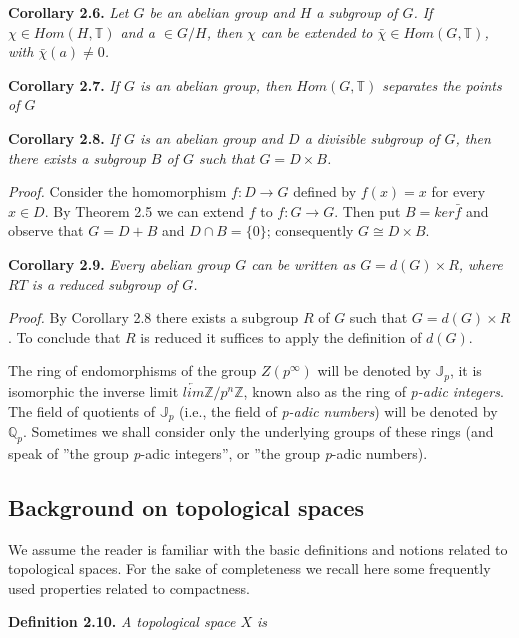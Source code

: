 \documentclass[12pt]{article}
\begin{document}
\textbf{Corollary 2.6.} \emph{Let $ G $ be an abelian group and $ H $ a subgroup of $ G $. If $ \chi \in Hom (H,\mathbb{T}) $ and a $ \in G / H $, then $ \chi $
can be extended to $ \bar{\chi} \in Hom (G,\mathbb{T}) $, with $ \bar{\chi}(a) \neq 0 $.}


\textbf{Corollary 2.7.} \emph{If $ G $ is an abelian group, then $ Hom (G,\mathbb{T}) $ separates the points of $ G $}


\textbf{Corollary 2.8.} \emph{If $ G $ is an abelian group and $ D $ a divisible subgroup of $ G $, then there exists a subgroup $ B $ of $ G $
such that $ G = D \times B $.}


\emph{Proof.} Consider the homomorphism $ f : D \to G $ defined by $ f(x) = x $ for every $ x \in D $. By Theorem 2.5 we can
extend $ f $ to $ f : G \to G $. Then put $ B = ker \bar{f} $ and observe that $ G = D + B $ and $ D \cap B = \{0\} $; consequently
$ G \cong D \times B $.


\textbf{Corollary 2.9.} \emph{Every abelian group $ G $ can be written as $ G = d(G) \times R $, where $ RT $ is a reduced subgroup of $ G $.}


\emph{Proof.} By Corollary 2.8 there exists a subgroup $ R $ of $ G $ such that $ G = d(G) \times R $. To conclude that $ R $ is reduced
it suffices to apply the definition of $ d(G) $.


    The ring of endomorphisms of the group $ Z(p^{\infty}) $ will be denoted by $ \mathbb{J}_p $, it is isomorphic the inverse limit
$ \underleftarrow{lim} \mathbb{Z} / p^{n} \mathbb{Z} $, known also as the ring of \emph{p-adic integers}. The field of quotients of $ \mathbb{J}_p $ (i.e., the field of \emph{p-adic
numbers}) will be denoted by $ \mathbb{Q}_p $. Sometimes we shall consider only the underlying groups of these rings (and
speak of ”the group \emph{p}-adic integers”, or ”the group \emph{p}-adic numbers).


\subsection{Background on topological spaces}


    We assume the reader is familiar with the basic definitions and notions related to topological spaces. For the
sake of completeness we recall here some frequently used properties related to compactness.

\textbf{Definition 2.10.} \emph{A topological space $ X $ is }
\end{document}
